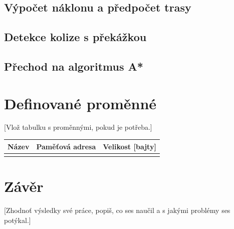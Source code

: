 \documentclass[10pt, a4paper]{article}
\begin{document}
\subsection{Výpočet náklonu a předpočet trasy}

\subsection{Detekce kolize s překážkou}

\subsection{Přechod na algoritmus A*}

\section{Definované proměnné}
[Vlož tabulku s proměnnými, pokud je potřeba.]

\begin{center}
    \begin{tabularx}{0.8\textwidth}{
        | >{\raggedright\arraybackslash}X
        | >{\raggedright\arraybackslash}X
        | >{\raggedright\arraybackslash}X | }
         \hline
         Název & Paměťová adresa & Velikost [bajty] \\
         \hline
         [doplň údaje] &  &  \\
         \hline
    \end{tabularx}
\end{center}

\section{Závěr}
[Zhodnoť výsledky své práce, popiš, co ses naučil a s jakými problémy ses potýkal.]

\newpage


\end{document}

